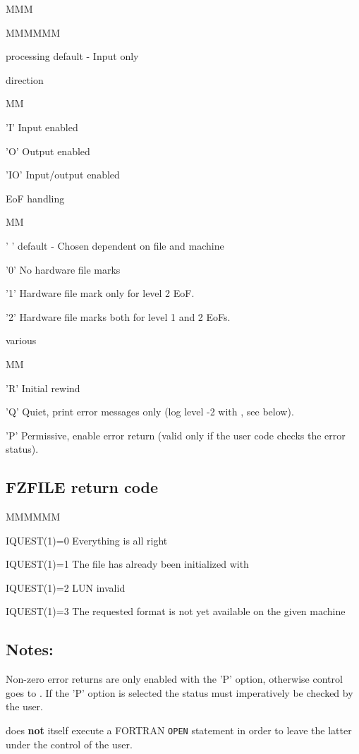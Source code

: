 \begin{DL}{MMM}
\begin{DL}{MMMMMM}
\item[processing]default - Input only
\item[direction]
\begin{DL}{MM}
\item['I']Input enabled
\item['O']Output enabled
\item['IO']Input/output enabled
\end{DL}
\item[EoF handling]
\begin{DL}{MM}
\item[' ']default - Chosen dependent on file and machine
\item['0']No hardware file marks
\item['1']Hardware file mark only for level 2 EoF.
\item['2']Hardware file marks both for level 1 and 2 EoFs.
\end{DL}
\item[various]
\begin{DL}{MM}
\item['R']Initial rewind
\item['Q']Quiet, print error messages only
(log level -2 with , see below).
\item['P']Permissive, enable error return
(valid only if the user code checks the error status).
\end{DL}
\end{DL}
\end{DL}
\subsection{FZFILE return code}
\begin{DL}{MMMMMM}
\item[IQUEST(1)=0]Everything is all right
\item[IQUEST(1)=1]The file has already been initialized with 
\item[IQUEST(1)=2]LUN invalid
\item[IQUEST(1)=3]The requested format is not yet available on the given machine
\end{DL}
\subsection{Notes:}
Non-zero error returns are only enabled with the 'P' option,
otherwise control goes to . If the 'P' option is selected
the status must imperatively be checked by the user.
\par {} does {\bf not} itself execute a FORTRAN
{\tt OPEN} statement in
order to leave the latter under the control of the user.
